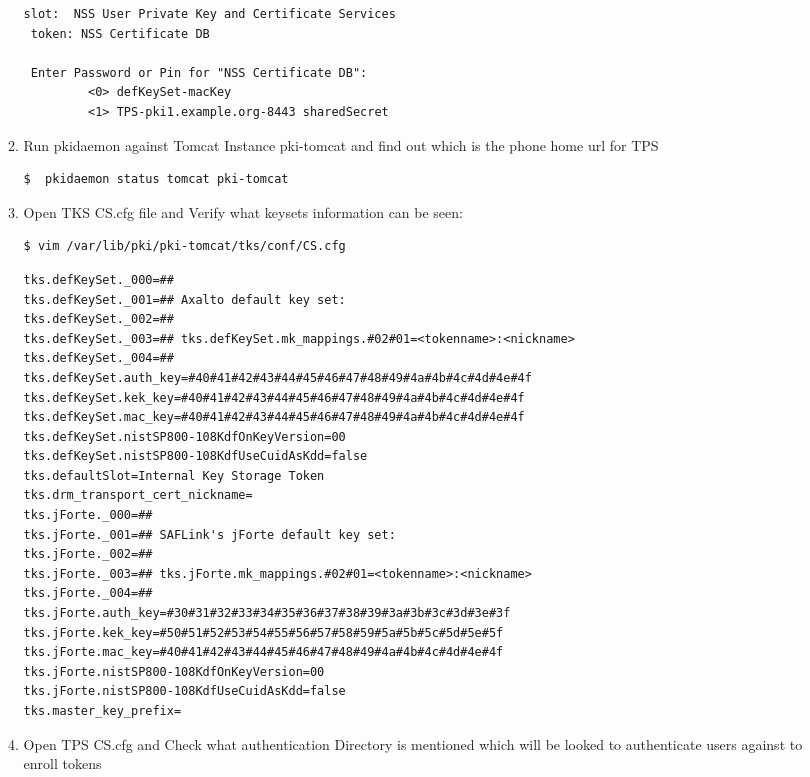 \documentclass[12pt]{report}
\begin{document}
\begin{enumerate}[label*=\arabic*.]
\begin{enumerate}[label*=\arabic*.]
\begin{lstlisting}[style=bashInputStyle]
 slot:  NSS User Private Key and Certificate Services
 token: NSS Certificate DB

 Enter Password or Pin for "NSS Certificate DB":
         <0> defKeySet-macKey
         <1> TPS-pki1.example.org-8443 sharedSecret
                    \end{lstlisting}
              \item Run pkidaemon against Tomcat Instance pki-tomcat and find out which is the phone home url for TPS
                  \begin{lstlisting}[style=bashInputStyle]
$  pkidaemon status tomcat pki-tomcat                  
                  \end{lstlisting}
               \item Open TKS CS.cfg file and Verify what keysets information can be seen:
                   \begin{lstlisting}[style=bashInputStyle]
$ vim /var/lib/pki/pki-tomcat/tks/conf/CS.cfg                   
                   \end{lstlisting}
                   \begin{lstlisting}
tks.defKeySet._000=##
tks.defKeySet._001=## Axalto default key set:
tks.defKeySet._002=##
tks.defKeySet._003=## tks.defKeySet.mk_mappings.#02#01=<tokenname>:<nickname>
tks.defKeySet._004=##
tks.defKeySet.auth_key=#40#41#42#43#44#45#46#47#48#49#4a#4b#4c#4d#4e#4f
tks.defKeySet.kek_key=#40#41#42#43#44#45#46#47#48#49#4a#4b#4c#4d#4e#4f
tks.defKeySet.mac_key=#40#41#42#43#44#45#46#47#48#49#4a#4b#4c#4d#4e#4f
tks.defKeySet.nistSP800-108KdfOnKeyVersion=00
tks.defKeySet.nistSP800-108KdfUseCuidAsKdd=false
tks.defaultSlot=Internal Key Storage Token
tks.drm_transport_cert_nickname=
tks.jForte._000=##
tks.jForte._001=## SAFLink's jForte default key set:
tks.jForte._002=##
tks.jForte._003=## tks.jForte.mk_mappings.#02#01=<tokenname>:<nickname>
tks.jForte._004=##
tks.jForte.auth_key=#30#31#32#33#34#35#36#37#38#39#3a#3b#3c#3d#3e#3f
tks.jForte.kek_key=#50#51#52#53#54#55#56#57#58#59#5a#5b#5c#5d#5e#5f
tks.jForte.mac_key=#40#41#42#43#44#45#46#47#48#49#4a#4b#4c#4d#4e#4f
tks.jForte.nistSP800-108KdfOnKeyVersion=00
tks.jForte.nistSP800-108KdfUseCuidAsKdd=false
tks.master_key_prefix=
                   \end{lstlisting}
                \item Open TPS CS.cfg and Check what authentication Directory is mentioned which 
                    will be looked to authenticate users against to enroll tokens
                    \begin{lstlisting}[style=bashInputStyle]

\end{lstlisting}
\end{enumerate}
\end{enumerate}
\end{document}
